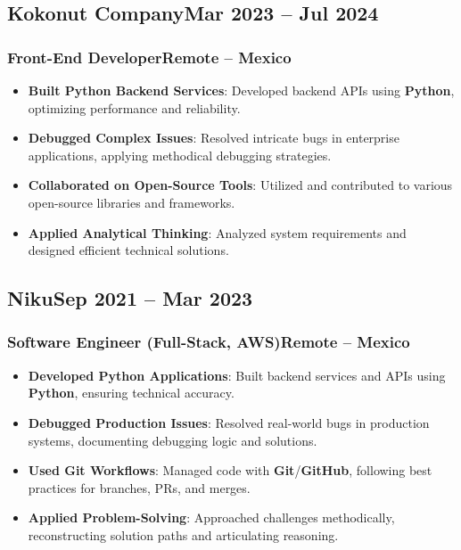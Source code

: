 \documentclass[a4paper,10pt]{article}
\newcommand{\tech}[1]{\textbf{\textcolor{tech}{#1}}}
\begin{document}
\subsection*{Kokonut Company\hfill\textbf{Mar 2023 -- Jul 2024}}
\subsubsection*{Front-End Developer\hfill Remote -- Mexico}
\begin{itemize}[noitemsep, leftmargin=*]
    \item \textbf{Built Python Backend Services}: Developed backend APIs using \tech{Python}, optimizing performance and reliability.
    \item \textbf{Debugged Complex Issues}: Resolved intricate bugs in enterprise applications, applying methodical debugging strategies.
    \item \textbf{Collaborated on Open-Source Tools}: Utilized and contributed to various open-source libraries and frameworks.
    \item \textbf{Applied Analytical Thinking}: Analyzed system requirements and designed efficient technical solutions.
\end{itemize}

\subsection*{Niku\hfill\textbf{Sep 2021 -- Mar 2023}}
\subsubsection*{Software Engineer (Full-Stack, AWS)\hfill Remote -- Mexico}
\begin{itemize}[noitemsep, leftmargin=*]
    \item \textbf{Developed Python Applications}: Built backend services and APIs using \tech{Python}, ensuring technical accuracy.
    \item \textbf{Debugged Production Issues}: Resolved real-world bugs in production systems, documenting debugging logic and solutions.
    \item \textbf{Used Git Workflows}: Managed code with \tech{Git}/\tech{GitHub}, following best practices for branches, PRs, and merges.
    \item \textbf{Applied Problem-Solving}: Approached challenges methodically, reconstructing solution paths and articulating reasoning.
\end{itemize}
\end{document}
